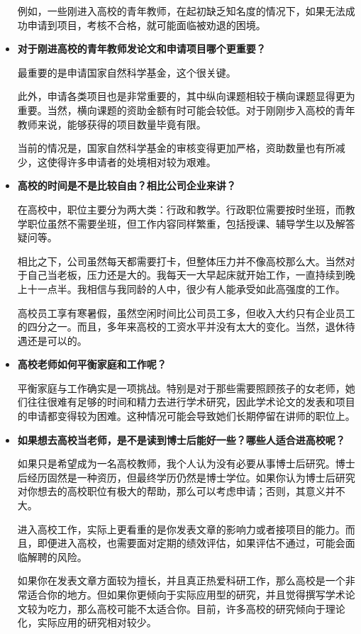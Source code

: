 \begin{itemize}
例如，一些刚进入高校的青年教师，在起初缺乏知名度的情况下，如果无法成功申请到项目，考核不合格，就可能面临被劝退的困境。

    \item \textbf{对于刚进高校的青年教师发论文和申请项目哪个更重要？}

最重要的是申请国家自然科学基金，这个很关键。

此外，申请各类项目也是非常重要的，其中纵向课题相较于横向课题显得更为重要。当然，横向课题的资助金额有时可能会较低。对于刚刚步入高校的青年教师来说，能够获得的项目数量毕竟有限。

当前的情况是，国家自然科学基金的审核变得更加严格，资助数量也有所减少，这使得许多申请者的处境相对较为艰难。


    \item \textbf{高校的时间是不是比较自由？相比公司企业来讲？}

在高校中，职位主要分为两大类：行政和教学。行政职位需要按时坐班，而教学职位虽然不需要坐班，但工作内容同样繁重，包括授课、辅导学生以及解答疑问等。

相比之下，公司虽然每天都需要打卡，但整体压力并不像高校那么大。当然对于自己当老板，压力还是大的。我每天一大早起床就开始工作，一直持续到晚上十一点半。我相信与我同龄的人中，很少有人能承受如此高强度的工作。

高校员工享有寒暑假，虽然空闲时间比公司员工多，但收入大约只有企业员工的四分之一。而且，多年来高校的工资水平并没有太大的变化。当然，退休待遇还是可以的。


    \item \textbf{高校老师如何平衡家庭和工作呢？}

平衡家庭与工作确实是一项挑战。特别是对于那些需要照顾孩子的女老师，她们往往很难有足够的时间和精力去进行学术研究，因此学术论文的发表和项目的申请都变得较为困难。这种情况可能会导致她们长期停留在讲师的职位上。

    \item \textbf{如果想去高校当老师，是不是读到博士后能好一些？哪些人适合进高校呢？}

如果只是希望成为一名高校教师，我个人认为没有必要从事博士后研究。博士后经历固然是一种资历，但最终学历仍然是博士学位。如果你认为博士后研究对你想去的高校职位有极大的帮助，那么可以考虑申请；否则，其意义并不大。

进入高校工作，实际上更看重的是你发表文章的影响力或者接项目的能力。而且，即便进入高校，也需要面对定期的绩效评估，如果评估不通过，可能会面临解聘的风险。

如果你在发表文章方面较为擅长，并且真正热爱科研工作，那么高校是一个非常适合你的地方。但如果你更倾向于实际应用型的研究，并且觉得撰写学术论文较为吃力，那么高校可能不太适合你。目前，许多高校的研究倾向于理论化，实际应用的研究相对较少。


\end{itemize}
